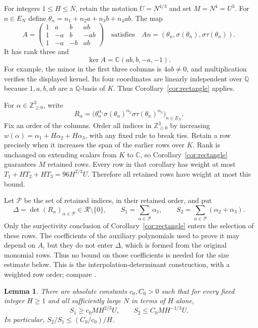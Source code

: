 \documentclass[11pt,a4paper]{amsart}
\newtheorem{lemma}[theorem]{Lemma}
\theoremstyle{remark}
\newcommand{\Q}{\mathbb Q}
\newcommand{\C}{\mathbb C}
\newcommand{\N}{\mathbb Z_{\ge0}}
\newcommand{\cR}{\mathcal R}
\newcommand{\cP}{\mathcal P}
\numberwithin{equation}{section}
\begin{document}
For integers $1\le H\le N$, retain the notation $U=N^{4/3}$ and set
$M=N^4=U^3$. For $n\in E_N$ define
$\theta_n=n_1+n_2a+n_3b+n_4ab$. The map
\begin{equation}\label{eq:A}
 A=\begin{pmatrix}
 1&a&b&ab\\1&-a&b&-ab\\1&-a&-b&ab
 \end{pmatrix}
 \quad\text{satisfies}\quad
 An=(\theta_n,\sigma(\theta_n),\sigma\tau(\theta_n)).
\end{equation}
It has rank three and
\[
 \ker A=\C(ab,b,-a,-1).
\]
For example, the minor in the first three columns is $4ab\ne0$,
and multiplication verifies the displayed kernel. Its four
coordinates are linearly independent over $\Q$ because
$1,a,b,ab$ are a $\Q$-basis of $K$. Thus
Corollary~\ref{cor:rectangle} applies.

For $\alpha\in\N^3$, write
\begin{equation}\label{eq:rows}
 R_\alpha=
 \bigl(\theta_n^{\alpha_1}\sigma(\theta_n)^{\alpha_2}
                   \sigma\tau(\theta_n)^{\alpha_3}\bigr)_{n\in E_N}.
\end{equation}
Fix an order of the columns. Order all indices in $\N^3$ by increasing
$w(\alpha)=\alpha_1+H\alpha_2+H\alpha_3$, with any fixed rule to
break ties. Retain a row precisely when it increases the span of
the earlier rows over $K$. Rank is unchanged on extending scalars
from $K$ to $\C$, so Corollary~\ref{cor:rectangle} guarantees $M$
retained rows. Every row in that corollary has weight at most
$T_1+HT_2+HT_3=96H^{2/3}U$. Therefore all retained rows have weight
at most this bound.

Let $\cP$ be the set of retained indices, in their retained order,
and put
\begin{equation}\label{eq:det}
 \Delta=\det(R_\alpha)_{\alpha\in\cP}\in\cR\setminus\{0\},
 \qquad S_1=\sum_{\alpha\in\cP}\alpha_1,
 \qquad S_2=\sum_{\alpha\in\cP}(\alpha_2+\alpha_3).
\end{equation}
Only the surjectivity conclusion of Corollary~\ref{cor:rectangle}
enters the selection of these rows. The coefficients of the auxiliary
polynomials used to prove it may depend on $A$, but they do not enter
$\Delta$, which is formed from the original monomial rows. Thus no
bound on those coefficients is needed for the size estimate below.
This is the interpolation-determinant construction, with a weighted row order; compare
\cite[Section~6]{Laurent}.

\begin{lemma}\label{lem:exponents}
There are absolute constants $c_0,C_0>0$ such that for every fixed
integer $H\ge1$ and all sufficiently large $N$ in terms of $H$ alone,
\begin{equation}\label{eq:exponents}
 S_1\ge c_0MH^{2/3}U,\qquad S_2\le C_0MH^{-1/3}U.
\end{equation}
In particular, $S_2/S_1\le(C_0/c_0)/H$.
\end{lemma}
\end{document}
